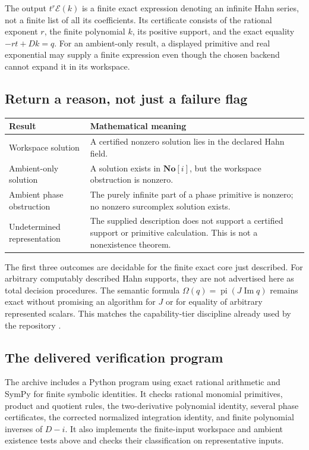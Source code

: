 \documentclass[11pt,a4paper]{article}
\numberwithin{equation}{section}
\theoremstyle{definition}
\theoremstyle{remark}
\newcommand{\No}{\mathbf{No}}
\newcommand{\EE}{\mathcal E}
\newcommand{\Imm}{\operatorname{Im}}
\newcommand{\pipart}{\operatorname{pi}}
\begin{document}
The output $t^r\EE(k)$ is a finite exact expression denoting an infinite
Hahn series, not a finite list of all its coefficients. Its certificate
consists of the rational exponent $r$, the finite polynomial $k$, its
positive support, and the exact equality $-rt+Dk=q$.
For an ambient-only result, a displayed primitive and real exponential may
supply a finite expression even though the chosen backend cannot expand it
in its workspace.

\subsection{Return a reason, not just a failure flag}

\begin{center}
\small
\begin{tabular}{@{}p{}p{}@{}}
\toprule
Result & Mathematical meaning\\
\midrule
Workspace solution & A certified nonzero solution lies in the declared Hahn field.\\[3pt]
Ambient-only solution & A solution exists in $\No[i]$, but the workspace obstruction is nonzero.\\[3pt]
Ambient phase obstruction & The purely infinite part of a phase primitive is nonzero; no nonzero surcomplex solution exists.\\[3pt]
Undetermined representation & The supplied description does not support a certified support or primitive calculation. This is not a nonexistence theorem.\\
\bottomrule
\end{tabular}
\end{center}

The first three outcomes are decidable for the finite exact core just
described. For arbitrary computably described Hahn supports, they are not
advertised here as total decision procedures. The semantic formula
$\Omega(q)=\pipart(J\Imm q)$ remains exact without promising an algorithm
for $J$ or for equality of arbitrary represented scalars. This matches the
capability-tier discipline already used by the repository \cite{RepoCAS}.

\subsection{The delivered verification program}

The archive includes a Python program using exact rational arithmetic and
SymPy for finite symbolic identities. It checks rational monomial
primitives, product and quotient rules, the two-derivative polynomial
identity, several phase certificates, the corrected normalized integration
identity, and finite polynomial inverses of $D-i$. It also implements the
finite-input workspace and ambient existence tests above and checks their
classification on representative inputs.
\end{document}
